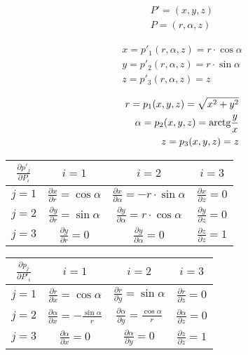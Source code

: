 \begin{equation}
\begin{split}
P' = (x, y, z) \\
P = (r, \alpha, z)
\end{split}
\end{equation}

\begin{equation}
\begin{split}
x = p'_1(r, \alpha, z) = r \cdot \cos \alpha \\
y = p'_2(r, \alpha, z) = r \cdot \sin \alpha \\
z = p'_3(r, \alpha, z) = z
\end{split}
\end{equation}

\begin{equation}
\begin{split}
r = p_1(x, y, z) = \sqrt{x^2 + y^2} \\
\alpha = p_2(x, y, z) = \mathrm{arctg} \frac{y}{x} \\
z = p_3(x, y, z) = z
\end{split}
\end{equation}

\begin{tabular}{| c || c | c | c |}
\hline
\(\frac{\partial p'_j}{\partial P_i}\) & \(i=1\) & \(i=2\) & \(i=3\) \\
\hline
\hline
\(j=1\) & \(\frac{\partial x}{\partial r} = \cos \alpha\) & \(\frac{\partial x}{\partial \alpha} = -r \cdot \sin \alpha\) & \(\frac{\partial x}{\partial z} = 0\) \\
\hline
\(j=2\) & \(\frac{\partial y}{\partial r} = \sin \alpha\) & \(\frac{\partial y}{\partial \alpha} = r \cdot \cos \alpha\) & \(\frac{\partial y}{\partial z} = 0\) \\
\hline
\(j=3\) & \(\frac{\partial y}{\partial r} = 0\) & \(\frac{\partial y}{\partial \alpha} = 0\) & \(\frac{\partial z}{\partial z} = 1\) \\
\hline
\end{tabular}

\begin{tabular}{| c || c | c | c |}
\hline
\(\frac{\partial p_j}{\partial P'_i}\) & \(i=1\) & \(i=2\) & \(i=3\)\\
\hline
\hline
\(j=1\) & \(\frac{\partial r}{\partial x} = \cos \alpha\) & \(\frac{\partial r}{\partial y} = \sin \alpha\) & \(\frac{\partial r}{\partial z} = 0\)\\
\hline
\(j=2\) & \(\frac{\partial \alpha}{\partial x} = -\frac{\sin \alpha}{r}\) & \(\frac{\partial \alpha}{\partial y} = \frac{\cos \alpha}{r}\) & \(\frac{\partial \alpha}{\partial z} = 0\)\\
\hline
\(j=3\) & \(\frac{\partial \alpha}{\partial x} = 0\) & \(\frac{\partial \alpha}{\partial y} = 0\) & \(\frac{\partial z}{\partial z} = 1\)\\
\hline
\end{tabular}

